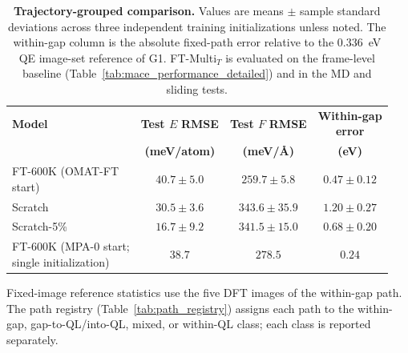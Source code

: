 \documentclass[pdflatex,sn-mathphys-num]{sn-jnl}%
\theoremstyle{thmstyleone}%
\theoremstyle{thmstyletwo}%
\theoremstyle{thmstylethree}%
\begin{document}
\begin{table}[htbp]
    \centering
\scriptsize
\setlength{\tabcolsep}{1.5pt}
    \caption{\textbf{Trajectory-grouped comparison.} Values are means $\pm$ sample standard deviations across three independent training initializations unless noted. The within-gap column is the absolute fixed-path error relative to the 0.336~eV QE image-set reference of G1. FT-Multi$_T$ is evaluated on the frame-level baseline (Table~\ref{tab:mace_performance_detailed}) and in the MD and sliding tests.}
    \label{tab:mace_performance_grouped}
    \begin{tabular}{@{}lccc@{}}
        \toprule
        \textbf{Model} & \shortstack{\textbf{Test $E$}\\\textbf{RMSE}} & \shortstack{\textbf{Test $F$}\\\textbf{RMSE}} & \shortstack{\textbf{Within-gap}\\\textbf{error}} \\
        & \textbf{(meV/atom)} & \textbf{(meV/\AA)} & \textbf{(eV)} \\
        \midrule
        \shortstack[l]{FT-600K (OMAT-FT\\start)} & $40.7 \pm 5.0$ & $259.7 \pm 5.8$ & $0.47 \pm 0.12$ \\
        Scratch & $30.5 \pm 3.6$ & $343.6 \pm 35.9$ & $1.20 \pm 0.27$ \\
        Scratch-5\% & $16.7 \pm 9.2$ & $341.5 \pm 15.0$ & $0.68 \pm 0.20$ \\
        \shortstack[l]{FT-600K (MPA-0 start;\\single initialization)} & $38.7$ & $278.5$ & $0.24$ \\
        \bottomrule
    \end{tabular}
\end{table}
Fixed-image reference statistics use the five DFT images of the within-gap path. The path registry (Table~\ref{tab:path_registry}) assigns each path to the within-gap, gap-to-QL/into-QL, mixed, or within-QL class; each class is reported separately.
\end{document}
